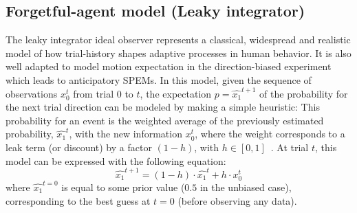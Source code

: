 \documentclass[12pt,english]{article}%
\newcommand{\eql}[1]{\begin{equation}#1\end{equation}}
\newcommand{\citep}[1]{\parencite{#1}}
\begin{document}
\subsection{Forgetful-agent model (Leaky integrator)}%
The leaky integrator ideal observer represents a classical, widespread and
realistic model of how trial-history shapes
adaptive processes in human behavior.
It is also well adapted to model motion expectation in the direction-biased experiment which leads to anticipatory SPEMs.
In this model, given the sequence of observations $x_0^t$ from trial $0$ to $t$,
the expectation $p=\hat{x_1}^{t+1}$ of the probability for the next trial direction can be modeled by making a simple heuristic:
This probability for an event is the weighted average of
the previously estimated probability, $\hat{x_1}^{t}$, with the new information $x_0^t$,
where the weight corresponds to a leak term (or discount)
by a factor $(1 - h)$, with $h \in [0, 1]$~\citep{Anderson2006}.
At trial $t$, this model can be expressed with the following equation:
\eql{
\hat{x_1}^{t+1} = (1 - h) \cdot \hat{x_1}^{t} + h \cdot x_0^t
\label{eq:leaky}}
where $\hat{x_1}^{t=0}$ is equal to some prior value ($0.5$ in the unbiased case),
corresponding to the best guess at $t=0$ (before observing any data).
\end{document}

